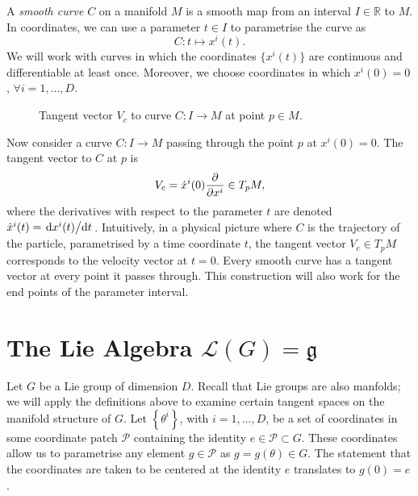 \begin{definition}
  A \emph{smooth curve} $C$ on a manifold $M$ is a smooth map from an interval $I \in \mathbb{R}$ to $M$.
  In coordinates, we can use a parameter $t \in I$ to parametrise the curve as
  \begin{equation}
    C\colon t \mapsto x^i(t).
  \end{equation}
  We will work with curves in which the coordinates $\{ x^i (t) \}$ are continuous and differentiable at least once.
  Moreover, we choose coordinates in which $x^i(0) = 0$, $\forall i = 1, \ldots, D$.
\end{definition}
\begin{figure}[htpb]
  \centering
  \def\svgwidth{0.3\columnwidth}
  
  \caption{Tangent vector $V_c$ to curve $C\colon I \to M$ at point $p \in M$.}
  \label{fig:tangentcurve}
\end{figure}
Now consider a curve $C\colon I \to M$ passing through the point $p$ at $x^i(0) = 0$. The tangent vector to $C$ at $p$ is
\begin{equation}
  V_c = \dot x^i(0) \pdv{}{x^i} \in T_p M,
\end{equation}
where the derivatives with respect to the parameter $t$ are denoted $\dot x^i(t) = \dv*{x^i(t)}{t}$.
Intuitively, in a physical picture where $C$ is the trajectory of the particle, parametrised by a time coordinate $t$, the tangent vector $V_c \in T_p M$ corresponds to the velocity vector at $t = 0$.
Every smooth curve has a tangent vector at every point it passes through.
This construction will also work for the end points of the parameter interval.

\section{The Lie Algebra \texorpdfstring{$\mathscr{L}(G) = \mathfrak{g}$}{of G}}%
\label{sec:the_lie_algebra_of_G}

Let $G$ be a Lie group of dimension $D$. Recall that Lie groups are also manfolds; we will apply the definitions above to examine certain tangent spaces on the manifold structure of $G$. Let $\left\{ \theta^i \right\}$, with $i = 1, \ldots, D$, be a set of coordinates in some coordinate patch $\mathcal{P}$ containing the identity $e \in \mathcal{P} \subset G$.
These coordinates allow us to parametrise any element $g \in \mathcal{P}$ as $g = g(\theta) \in G$. The statement that the coordinates are taken to be centered at the identity $e$ translates to $g(0) = e$.

